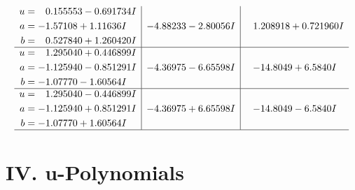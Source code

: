 \documentclass[1p]{elsarticle_modified}
\theoremstyle{definition}
\begin{document}
$$\begin{array}{c|c|c}
\begin{aligned}
u &= \phantom{-}0.155553 - 0.691734 I \\
a &= -1.57108 + 1.11636 I \\
b &= \phantom{-}0.527840 + 1.260420 I\end{aligned}
 & -4.88233 - 2.80056 I & \phantom{-}1.208918 + 0.721960 I \\ \hline\begin{aligned}
u &= \phantom{-}1.295040 + 0.446899 I \\
a &= -1.125940 - 0.851291 I \\
b &= -1.07770 - 1.60564 I\end{aligned}
 & -4.36975 - 6.65598 I & -14.8049 + 6.5840 I \\ \hline\begin{aligned}
u &= \phantom{-}1.295040 - 0.446899 I \\
a &= -1.125940 + 0.851291 I \\
b &= -1.07770 + 1.60564 I\end{aligned}
 & -4.36975 + 6.65598 I & -14.8049 - 6.5840 I\\
 \hline 
 \end{array}$$\newpage
\newpage\renewcommand{\arraystretch}{1}
\centering \section*{ IV. u-Polynomials}
\end{document}
